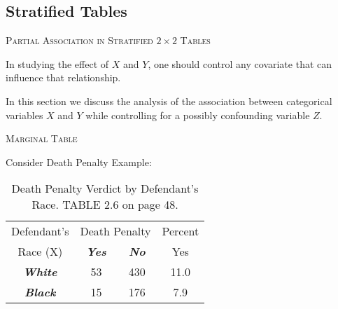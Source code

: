 \documentclass[dvipdfmx, serif,handout]{beamer}
\begin{document}
\subsection{Stratified Tables}
\begin{frame}{\textsc{Partial Association in Stratified $2\times 2$ Tables}}

	\bi
	\item In studying the effect of $X$ and $Y$, one should control any covariate that can influence that relationship.
	\item In this section we discuss the analysis of the association between categorical variables $X$ and $Y$ while controlling for a possibly confounding variable $Z$.
	\ei

\end{frame}
\begin{frame}{\textsc{Marginal Table}}

	\bi
	\item Consider Death Penalty Example:
	\vspace{.5cm}
	{\scriptsize
		\begin{table} %
			\begin{tabular}{cccc} \hline
				Defendant's      & \multicolumn{2}{c}{Death Penalty} (Y) & Percent              \\ \cline{2-3}
				{Race} (X)       & {\bf{\em Yes}}                        & {\bf{\em No}} & Yes  \\ \hline
				{\bf{\em White}} & 53                                    & 430           & 11.0 \\
				{\bf{\em Black}} & 15                                    & 176           & 7.9  \\ \hline
			\end{tabular}
			\caption{\scriptsize Death Penalty Verdict by Defendant's Race. TABLE 2.6 on page 48.}
		\end{table}
	}
	\ei

\end{frame}
\end{document}
